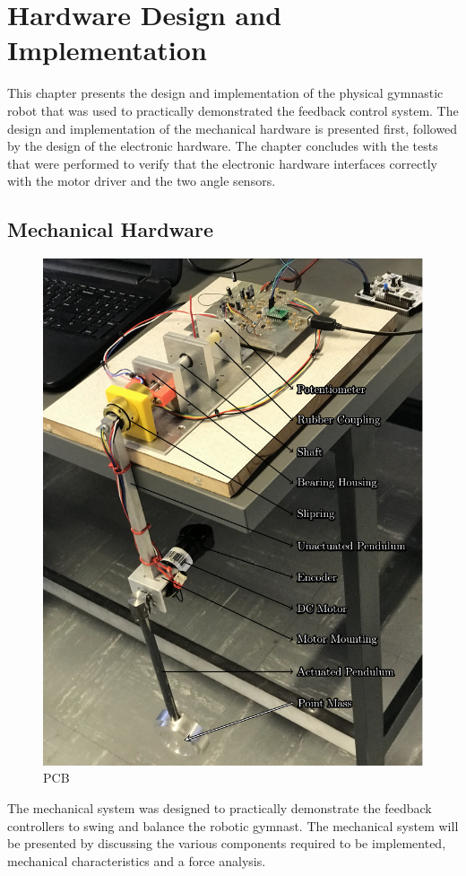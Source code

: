 \chapter{Hardware Design and Implementation}
This chapter presents the design and implementation of the physical gymnastic robot that was used to practically demonstrated the feedback control system. The design and implementation of the mechanical hardware is presented first, followed by the design of the electronic hardware. The chapter concludes with the tests that were performed to verify that the electronic hardware interfaces correctly with the motor driver and the two angle sensors.

\section{Mechanical Hardware}
\label{sec:mechanical_hardware}

\begin{figure}[h]
	\centering
	\includegraphics{./figs/mech_layout/mech_layout.pdf}
	\caption{PCB}
	\label{fig:mech_layout}
\end{figure}
The mechanical system was designed to practically demonstrate the feedback controllers to swing and balance the robotic gymnast. The mechanical system will be presented by discussing the various components required to be implemented, mechanical characteristics and a force analysis.\\

